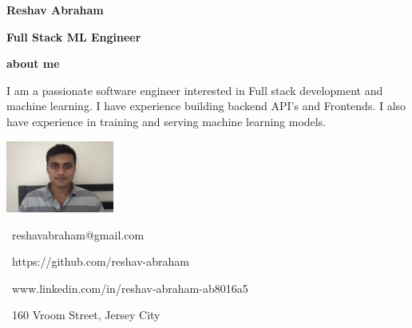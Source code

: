 \documentclass{article}
\begin{document}
    \begin{minipage}[t]{5.5in\linewidth}
    \Huge\vspace{0in}\hspace{-0.30em}\textbf{Reshav Abraham}  

    \vspace{0em}\hspace{-0.2em}\Large\textbf{Full Stack ML Engineer} 

    \vspace{0.5em}\hspace{0em}\small\textbf{about me} 

        \begin{minipage}[t]{0.6\textwidth\hspace{0em}}
        I am a passionate software engineer interested in Full stack development
        and machine learning. I have experience building backend API's and Frontends. I also have experience in training and serving machine learning models. \par
        \end{minipage}
    \end{minipage}
    \begin{minipage}[t]{3in\linewidth\hspace{-2.3em}}
        \small
        \strut\vspace*{-\baselineskip}\newline\includegraphics[width=1.4in]{reshav}

        \faEnvelopeO \, reshavabraham@gmail.com
        
        \faGithub\hspace \, https://github.com/reshav-abraham 

        \faLinkedin \, www.linkedin.com/in/reshav-abraham-ab8016a5

        \faHome \, 160 Vroom Street, Jersey City
    \end{minipage}

\vspace{1.3em}
\end{document}
